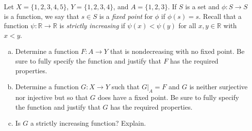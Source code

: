 \documentclass[11pt,letterpaper]{article}
\begin{document}
\newpage



 Let $X= \{ 1, 2, 3, 4, 5 \}$, $Y= \{ 1, 2, 3, 4 \}$, and $A= \{ 1, 2, 3 \}$. If $S$ is a set and $\phi: S \to S$ is a function, we say that $s \in S$ is a \textit{fixed point} for $\phi$ if $\phi(s)= s$. Recall that a function $\psi: \mathbb{R} \to \mathbb{R}$ is \textit{strictly increasing} if $\psi(x) < \psi(y)$ for all $x, y \in \mathbb{R}$ with $x < y$.
	\begin{enumerate}[(a)]
	\item Determine a function $F: A \to Y$ that is nondecreasing with no fixed point. Be sure to fully specify the function and justify that $F$ has the required properties. 
	\item Determine a function $G: X \to Y$ such that $G \big|_A= F$ and $G$ is neither surjective nor injective but so that $G$ does have a fixed point. Be sure to fully specify the function and justify that $G$ has the required properties. 
	\item Is $G$ a strictly increasing function? Explain. 
	\end{enumerate} \pspace
\end{document}
